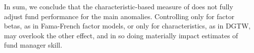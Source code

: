 \par In sum, we conclude that the characteristic-based measure of \citet{daniel1997measuring} does not fully adjust fund performance for the main anomalies. Controlling only for factor betas, as in Fama-French factor models, or only for characteristics, as in DGTW, may overlook the other effect, and in so doing materially impact estimates of fund manager skill. 

